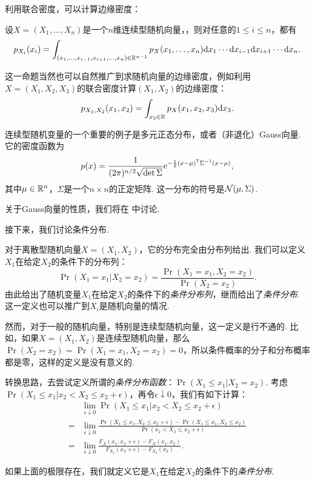 利用联合密度，可以计算边缘密度：
\begin{theorem}\label{thm:continuous-marginal}
    设$X=(X_1,\dots,X_n)$是一个$n$维连续型随机向量，，则对任意的$1\leq i\leq n$，都有
    \[p_{X_i}(x_i)=\int_{(x_1,\dots,x_{i-1},x_{i+1},\dots,x_n)\in\mathbb{R}^{n-1}}p_X(x_1,\dots,x_n)\mathrm{d} x_1\cdots\mathrm{d} x_{i-1}\mathrm{d} x_{i+1}\cdots\mathrm{d} x_n.\]
\end{theorem}

这一命题当然也可以自然推广到求随机向量的边缘密度，例如利用$X=(X_1,X_2,X_3)$的联合密度计算$(X_1,X_2)$的边缘密度：
\[
    p_{X_1,X_2}(x_1,x_2) = \int_{x_3\in\mathbb{R}}p_X(x_1,x_2,x_3)\mathrm{d} x_3.
\]

连续型随机变量的一个重要的例子是多元正态分布，或者（非退化）Gauss向量. 它的密度函数为
\[p(x)=\frac{1}{(2\pi)^{n/2}\sqrt{\det\Sigma}}\mathrm{e}^{-\frac{1}{2}(x-\mu)^{\mathsf{T}}\Sigma^{-1}(x-\mu)},\]
其中$\mu\in\mathbb{R}^n$，$\Sigma$是一个$n\times n$的正定矩阵. 这一分布的符号是$\mathcal{N}(\mu,\Sigma)$. 

关于Gauss向量的性质，我们将在 中讨论. 

接下来，我们讨论条件分布. 

对于离散型随机向量$X=(X_1,X_2)$，它的分布完全由分布列给出. 我们可以定义$X_1$在给定$X_2$的条件下的分布列：
\[\Pr(X_1=x_1|X_2=x_2)=\frac{\Pr(X_1=x_1,X_2=x_2)}{\Pr(X_2=x_2)}.\]
由此给出了随机变量$X_1$在给定$X_2$的条件下的\emph{条件分布列}，继而给出了\emph{条件分布}. 这一定义也可以推广到$X_i$是随机向量的情况. 

然而，对于一般的随机向量，特别是连续型随机向量，这一定义是行不通的. 比如，如果$X=(X_1,X_2)$是连续型随机向量，那么 $\Pr(X_2=x_2)=\Pr(X_1=x_1,X_2=x_2)=0$，所以条件概率的分子和分布概率都是零，这样的定义是没有意义的. 

转换思路，去尝试定义所谓的\emph{条件分布函数}：$\Pr(X_1\leq x_1|X_2=x_2)$. 考虑$\Pr(X_1\leq x_1|x_2< X_2\leq x_2+\epsilon)$，再令$\epsilon\downarrow 0$，我们有如下计算：
\begin{align*}
    &\lim_{\epsilon\downarrow 0}\Pr(X_1\leq x_1|x_2< X_2\leq x_2+\epsilon) \\
    =&\lim_{\epsilon\downarrow 0}\frac{\Pr(X_1\leq x_1,X_2\leq x_2+\epsilon)-\Pr(X_1\leq x_1,X_2\leq x_2)}{\Pr(x_2< X_2\leq x_2+\epsilon)}\\
    =&\lim_{\epsilon\downarrow 0}\frac{F_X(x_1,x_2+\epsilon)-F_X(x_1,x_2)}{F_{X_2}(x_2+\epsilon)-F_{X_2}(x_2)}.
\end{align*}

如果上面的极限存在，我们就定义它是$X_1$在给定$X_2$的条件下的\emph{条件分布}. 

